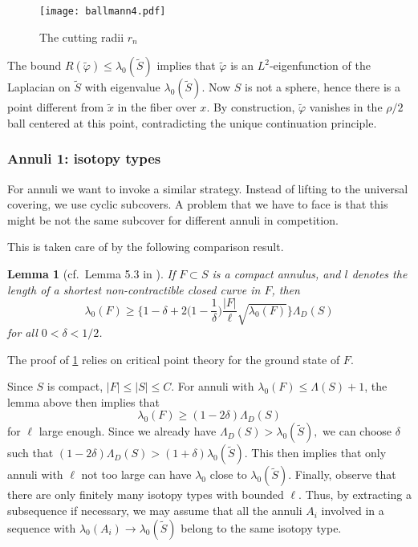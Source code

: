 \documentclass[a4paper,11pt]{amsart}
\numberwithin{equation}{section}
\newtheorem{lem}[equation]{Lemma}
\theoremstyle{definition}
\def\vf{\varphi}
\begin{document}
\begin{figure}
\texttt{[image: ballmann4.pdf]}
\caption{The cutting radii $r_n$}\label{figu}
\end{figure}

The bound $R(\tilde \varphi)\leq \lambda_0(\tilde S)$ implies that $\tilde\vf$ is an $L^2$-eigenfunction of the Laplacian on $\tilde S$ with eigenvalue $\lambda_0(\tilde S)$.
Now $S$ is not a sphere, hence there is a point different from $\tilde x$ in the fiber over $x$.
By construction, $\tilde \varphi$ vanishes in the $\rho/2$ ball centered at this point, contradicting the unique continuation principle.
 
\subsubsection{Annuli 1: isotopy types}
For annuli we want to invoke a similar strategy.
Instead of lifting to the universal covering, we use cyclic subcovers.
A problem that we have to face is that this might be not the same subcover for different annuli in competition.

This is taken care of by the following comparison result.

\begin{lem}[cf.\ Lemma 5.3 in \cite{BMM3}]\label{lambdad}
If $F \subset S$ is a compact annulus, and $l$ denotes the length of a shortest non-contractible closed curve in $F$, then
\begin{equation*}
  \lambda_0(F)\ge \big\{1-\delta
  + 2\big(1-\frac1\delta\big)\frac{|F|}{\ell}\sqrt{\lambda_0(F)}\big\}\Lambda_D(S)
\end{equation*}
for all $0<\delta<1/2$.
\end{lem}

The proof of \cref{lambdad} relies on critical point theory for the ground state of $F$.

Since $S$ is compact, $|F|\leq |S|\leq C$.
For annuli with $\lambda_0(F) \leq \Lambda(S)+1$, the lemma above then implies that 
\begin{equation}
\lambda_0(F)\geq (1-2\delta)\Lambda_D(S)
\end{equation}
for $\ell$ large enough.
Since we already have $\Lambda_D(S)>\lambda_0(\tilde S),$ we can choose $\delta$ such that
$(1-2\delta)\Lambda_D(S)>(1+\delta)\lambda_0(\tilde S)$.
This then implies that only annuli with $\ell$ not too large can have $\lambda_0$ close to $\lambda_0(\tilde S).$
Finally, observe that there are only finitely many isotopy types with bounded $\ell$.
Thus, by extracting a subsequence if necessary, we may assume that all the annuli $A_i$ involved in a sequence with $\lambda_0(A_i)\to\lambda_0(\tilde S)$ belong to the same isotopy type.
\end{document}
